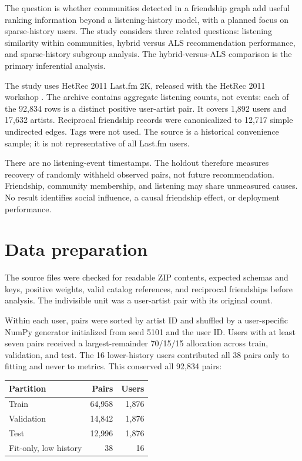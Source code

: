 \documentclass[10pt,a4paper]{article}
\begin{document}
The question is whether communities detected in a friendship graph add useful ranking information beyond a listening-history model, with a planned focus on sparse-history users. The study considers three related questions: listening similarity within communities, hybrid versus ALS recommendation performance, and sparse-history subgroup analysis. The hybrid-versus-ALS comparison is the primary inferential analysis.

The study uses HetRec 2011 Last.fm 2K, released with the HetRec 2011 workshop \cite{cantador2011}. The archive contains aggregate listening counts, not events: each of the 92,834 rows is a distinct positive user-artist pair. It covers 1,892 users and 17,632 artists. Reciprocal friendship records were canonicalized to 12,717 simple undirected edges. Tags were not used. The source is a historical convenience sample; it is not representative of all Last.fm users.

There are no listening-event timestamps. The holdout therefore measures recovery of randomly withheld observed pairs, not future recommendation. Friendship, community membership, and listening may share unmeasured causes. No result identifies social influence, a causal friendship effect, or deployment performance.

\section{Data preparation}

The source files were checked for readable ZIP contents, expected schemas and keys, positive weights, valid catalog references, and reciprocal friendships before analysis. The indivisible unit was a user-artist pair with its original count.

Within each user, pairs were sorted by artist ID and shuffled by a user-specific NumPy generator initialized from seed 5101 and the user ID. Users with at least seven pairs received a largest-remainder 70/15/15 allocation across train, validation, and test. The 16 lower-history users contributed all 38 pairs only to fitting and never to metrics. This conserved all 92,834 pairs:

\begin{table}[h]
\centering
\begin{tabular}{lrr}
\toprule
Partition & Pairs & Users \\
\midrule
Train & 64,958 & 1,876 \\
Validation & 14,842 & 1,876 \\
Test & 12,996 & 1,876 \\
Fit-only, low history & 38 & 16 \\
\bottomrule
\end{tabular}
\end{table}
\end{document}
